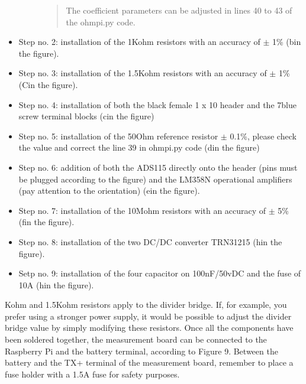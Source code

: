 \documentclass[letterpaper,10pt,english]{sphinxmanual}
\begin{document}
\begin{itemize}
\begin{description}
\begin{quote}
\sphinxAtStartPar
The coefficient parameters can be adjusted in lines 40 to 43 of the ohmpi.py code.
\end{quote}

\end{description}

\item {} 
\sphinxAtStartPar
Step no. 2: installation of the 1\sphinxhyphen{}Kohm resistors with an accuracy of \(\pm\) 1\% (b\sphinxhyphen{}in the figure).

\item {} 
\sphinxAtStartPar
Step no. 3: installation of the 1.5\sphinxhyphen{}Kohm resistors with an accuracy of \(\pm\) 1\%(C\sphinxhyphen{}in the figure).

\item {} 
\sphinxAtStartPar
Step no. 4: installation of both the black female 1 x 10 header and the 7\sphinxhyphen{}blue screw terminal blocks (c\sphinxhyphen{}in the figure)

\item {} 
\sphinxAtStartPar
Step no. 5: installation of the 50\sphinxhyphen{}Ohm reference resistor \(\pm\) 0.1\%, please check the value and correct the line 39 in ohmpi.py code (d\sphinxhyphen{}in the figure)

\item {} 
\sphinxAtStartPar
Step no. 6: addition of both the ADS115 directly onto the header (pins must be plugged according to the figure) and the LM358N operational amplifiers (pay attention to the orientation) (e\sphinxhyphen{}in the figure).

\item {} 
\sphinxAtStartPar
Step no. 7: installation of the 10\sphinxhyphen{}Mohm resistors with an accuracy of \(\pm\) 5\% (f\sphinxhyphen{}in the figure).

\item {} 
\sphinxAtStartPar
Step no. 8: installation of the two DC/DC converter TRN3\sphinxhyphen{}1215 (h\sphinxhyphen{}in the figure).

\item {} 
\sphinxAtStartPar
Setp no. 9: installation of the four capacitor on 100\sphinxhyphen{}nF/50vDC and the fuse of 10\sphinxhyphen{}A (h\sphinxhyphen{}in the figure).

\end{itemize}

\sphinxhyphen{}Kohm and 1.5\sphinxhyphen{}Kohm resistors apply to the divider bridge. If, for example, you prefer using a stronger power supply, it would be possible to adjust the divider bridge value by simply modifying these resistors.
Once all the components have been soldered together, the measurement board can be connected to the Raspberry Pi and the
battery terminal, according to Figure 9. Between the battery and the TX+ terminal of the measurement board, remember to
place a fuse holder with a 1.5\sphinxhyphen{}A fuse for safety purposes.
\end{document}
